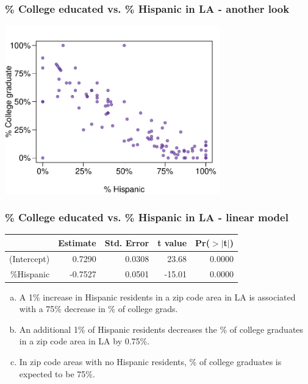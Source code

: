 
\begin{frame}
\frametitle{\% College educated vs. \% Hispanic in LA - another look}


\begin{center}
\includegraphics[width=0.7\textwidth]{7-4_inf_lin_reg/figures/la/la}
\end{center}

\end{frame}


\begin{frame}
\frametitle{\% College educated vs. \% Hispanic in LA - linear model}


{\small
\begin{center}
\begin{tabular}{rrrrr}
  \hline
 & Estimate & Std. Error & t value & Pr($>$$|$t$|$) \\ 
  \hline
(Intercept) & 0.7290 & 0.0308 & 23.68 & 0.0000 \\ 
 \%Hispanic & -0.7527 & 0.0501 & -15.01 & 0.0000 \\ 
   \hline
\end{tabular}
\end{center}
}

\begin{enumerate}[(a)]
\item A 1\% increase in Hispanic residents in a zip code area in LA is associated with a 75\% decrease in \% of college grads.
\item An additional 1\% of Hispanic residents decreases the \% of college graduates in a zip code area in LA by 0.75\%.
\item In zip code areas with no Hispanic residents, \% of college graduates is expected to be 75\%.
\end{enumerate}

\end{frame}

